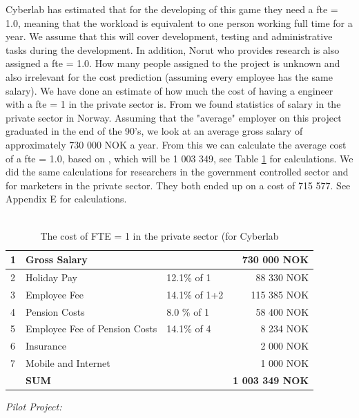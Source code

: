 Cyberlab has estimated that for the developing of this game they need a \ac{fte} = 1.0, meaning that the workload is equivalent to one person working full time for a year. We assume that this will cover development, testing and administrative tasks during the development. In addition, Norut who provides research is also assigned a \ac{fte} = 1.0. How many people assigned to the project is unknown and also irrelevant for the cost prediction (assuming every employee has the same salary). We have done an estimate of how much the cost of having a engineer with a \ac{fte} = 1 in the private sector is. From \cite{tekna} we found statistics of salary in the private sector in Norway. Assuming that the "average" employer on this project graduated in the end of the 90's, we look at an average gross salary of approximately 730 000 NOK a year. From this we can calculate the average cost of a \ac{fte} = 1.0, based on \cite{altinn}, which will be 1 003 349, see Table \ref{tab:costofFTE} for calculations. We did the same calculations for researchers in the government controlled sector and for marketers in the private sector. They both ended up on a cost of 715 577. See Appendix E for calculations.\\ \\
\begin{table}
\centering
    \begin{tabular}{|l|l|l|r|}
        \hline
       1&Gross Salary & & 730 000 NOK \\ \hline
       2&Holiday Pay & 12.1\% of 1  & 88 330 NOK \\ \hline
	   3&Employee Fee & 14.1\% of 1+2  & 115 385 NOK \\ \hline
	   4&Pension Costs & 8.0 \% of 1 & 58 400 NOK\\ \hline
	   5&Employee Fee of Pension Costs & 14.1\% of 4 & 8 234 NOK \\ \hline
	   6&Insurance & & 2 000 NOK \\ \hline
	   7&Mobile and Internet & & 1 000 NOK \\ \hline
	   & \textbf{SUM} & & \textbf{1 003 349 NOK} \\
	    \hline
    \end{tabular}
    \caption[Cost of FTE = 1]{The cost of FTE = 1 in the private sector (for Cyberlab}
    \label{tab:costofFTE}
\end{table}
\emph{Pilot Project:}\\
